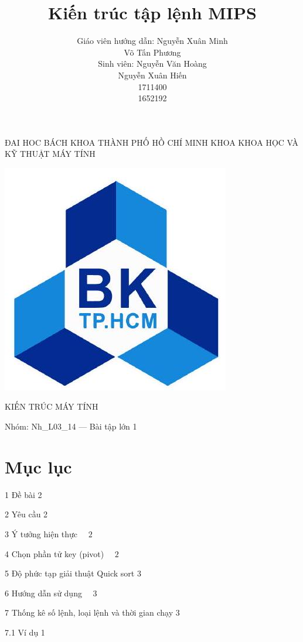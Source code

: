 \documentclass[a4paper]{article}
\title{Kiến trúc tập lệnh MIPS }
\author{Giáo viên hướng dẫn: Nguyễn Xuân Minh\\
Võ Tấn Phương\\
Sinh viên: Nguyễn Văn Hoàng\\
Nguyễn Xuân Hiến\\
1711400\\
1652192}
\date{}
\begin{document}
\maketitle
ĐAI HOC BÁCH KHOA THÀNH PHỐ HỒ CHÍ MINH KHOA KHOA HỌC VÀ KỸ THUẬT MÁY TÍNH

\begin{center}
\includegraphics[max width=\textwidth]{2023_12_26_b6dd10aae82b8bc52f5bg-1}
\end{center}

KIẾN TRÚC MÁY TÍNH

Nhóm: Nh\_L03\_14 — Bài tập lớn 1



\section*{Mục lục}
1 Đề bài 2

2 Yêu cầu 2

3 Ý tưởng hiện thực $\quad 2$

4 Chọn phần tử key (pivot) $\quad 2$

5 Độ phức tạp giải thuật Quick sort 3

6 Hướng dẫn sử dụng $\quad 3$

7 Thống kê số lệnh, loại lệnh và thời gian chạy 3

7.1 Ví dụ 1
\end{document}
